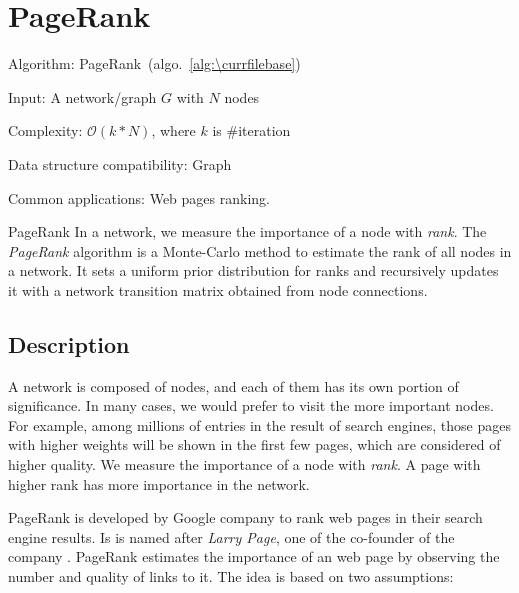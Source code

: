 \documentclass[catalog.tex]{subfiles}
\begin{document}
%
%

\def\pbname{PageRank} %

\section{\pbname} 

\begin{overview}
\item [Algorithm:] PageRank~(algo.~\ref{alg:\currfilebase}) 
\item [Input:] A network/graph $G$ with $N$ nodes
\item [Complexity:] $\mathcal{O}(k*N)$, where $k$ is \#iteration 
\item [Data structure compatibility:] Graph
\item [Common applications:] Web pages ranking.
\end{overview}


\begin{problem}{\pbname}
	In a network, we measure the importance of a node with \textit{rank}. The \textit{PageRank} algorithm is a Monte-Carlo method to estimate the rank of all nodes in a network. It sets a uniform prior distribution for ranks and recursively updates it with a network transition matrix obtained from node connections.
\end{problem}


\subsection*{Description}

A network is composed of nodes, and each of them has its own portion of significance. In many cases, we would prefer to visit the more important nodes. For example, among millions of entries in the result of search engines, those pages with higher weights will be shown in the first few pages, which are considered of higher quality. We measure the importance of a node with \textit{rank}. A page with higher rank has more importance in the network.

PageRank is developed by Google company to rank web pages in their search engine results. Is is named after \textit{Larry Page}, one of the co-founder of the company \cite{google}. PageRank estimates the importance of an web page by observing the number and quality of links to it. The idea is based on two assumptions:
\end{document}
